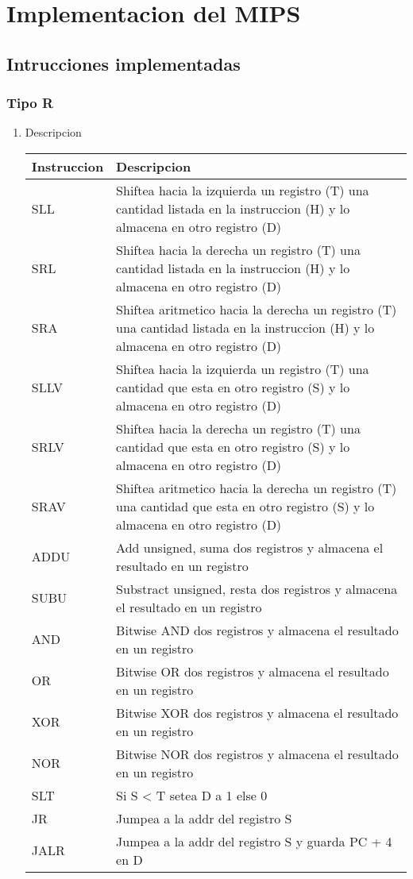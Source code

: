 \documentclass[11pt]{article}
\date{\today}
\title{}
\begin{document}
\tableofcontents

\section{Implementacion del MIPS}
\label{sec:org51af1a1}
\subsection{Intrucciones implementadas}
\label{sec:org3d5085e}
\subsubsection{Tipo R}
\label{sec:org11ce782}
\begin{enumerate}
\item Descripcion
\label{sec:org9c14c90}
\begin{center}
\begin{tabular}{|l|p{10cm}|}
\hline
Instruccion & Descripcion\\
\hline
SLL & Shiftea hacia la izquierda un registro (T) una cantidad listada en la instruccion (H) y lo almacena en otro registro (D)\\
\hline
SRL & Shiftea hacia la derecha un registro (T) una cantidad listada en la instruccion (H) y lo almacena en otro registro (D)\\
\hline
SRA & Shiftea aritmetico hacia la derecha un registro (T) una cantidad listada en la instruccion (H) y lo almacena en otro registro (D)\\
\hline
SLLV & Shiftea hacia la izquierda un registro (T) una cantidad que esta en otro registro (S) y lo almacena en otro registro (D)\\
\hline
SRLV & Shiftea hacia la derecha un registro (T) una cantidad que esta en otro registro (S) y lo almacena en otro registro (D)\\
\hline
SRAV & Shiftea aritmetico hacia la derecha un registro (T) una cantidad que esta en otro registro (S) y lo almacena en otro registro (D)\\
\hline
ADDU & Add unsigned, suma dos registros y almacena el resultado en un registro\\
\hline
SUBU & Substract unsigned, resta dos registros y almacena el resultado en un registro\\
\hline
AND & Bitwise AND dos registros y almacena el resultado en un registro\\
\hline
OR & Bitwise OR dos registros y almacena el resultado en un registro\\
\hline
XOR & Bitwise XOR dos registros y almacena el resultado en un registro\\
\hline
NOR & Bitwise NOR dos registros y almacena el resultado en un registro\\
\hline
SLT & Si S < T setea D a 1 else 0\\
\hline
JR & Jumpea a la addr del registro S\\
\hline
JALR & Jumpea a la addr del registro S y guarda PC + 4 en D\\
\hline
\end{tabular}
\end{center}


\end{enumerate}
\end{document}
